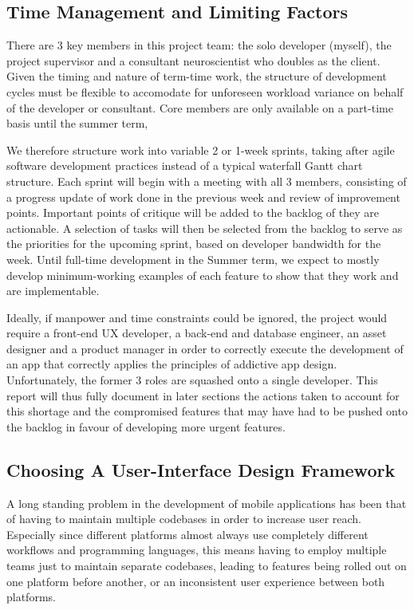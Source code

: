 \subsection{Time Management and Limiting Factors}
There are 3 key members in this project team: the solo developer (myself), the project supervisor and a consultant neuroscientist who doubles as the client. Given the timing and nature of term-time work, the structure of development cycles must be flexible to accomodate for unforeseen workload variance on behalf of the developer or consultant. Core members are only available on a part-time basis until the summer term,

We therefore structure work into variable 2 or 1-week sprints, taking after agile software development practices instead of a typical waterfall Gantt chart structure. Each sprint will begin with a meeting with all 3 members, consisting of a progress update of work done in the previous week and review of improvement points. Important points of critique will be added to the backlog of they are actionable. A selection of tasks will then be selected from the backlog to serve as the priorities for the upcoming sprint, based on developer bandwidth for the week. Until full-time development in the Summer term, we expect to mostly develop minimum-working examples of each feature to show that they work and are implementable.

Ideally, if manpower and time constraints could be ignored, the project would require a front-end UX developer, a back-end and database engineer, an asset designer and a product manager in order to correctly execute the development of an app that correctly applies the principles of addictive app design. Unfortunately, the former 3 roles are squashed onto a single developer. This report will thus fully document in later sections the actions taken to account for this shortage and the compromised features that may have had to be pushed onto the backlog in favour of developing more urgent features.

\subsection{Choosing A User-Interface Design Framework}
A long standing problem in the development of mobile applications has been that of having to maintain multiple codebases in order to increase user reach. Especially since different platforms almost always use completely different workflows and programming languages, this means having to employ multiple teams just to maintain separate codebases, leading to features being rolled out on one platform before another, or an inconsistent user experience between both platforms.

